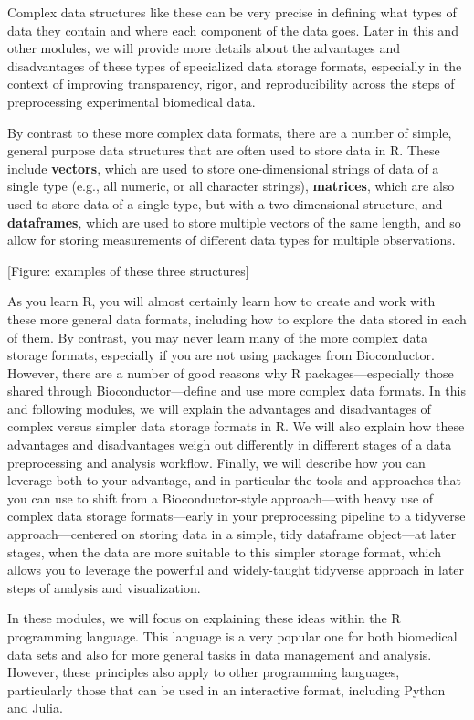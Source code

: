 \documentclass[]{tufte-book}
\begin{document}
Complex data structures like these can be very precise in defining what types of
data they contain and where each component of the data goes. Later in this and
other modules, we will provide more details about the advantages and
disadvantages of these types of specialized data storage formats, especially in
the context of improving transparency, rigor, and reproducibility across the
steps of preprocessing experimental biomedical data.

By contrast to these more complex data formats, there are a number of simple,
general purpose data structures that are often used to store data in R. These
include \textbf{vectors}, which are used to store one-dimensional strings of data of
a single type (e.g., all numeric, or all character strings), \textbf{matrices}, which
are also used to store data of a single type, but with a two-dimensional
structure, and \textbf{dataframes}, which are used to store multiple vectors of the
same length, and so allow for storing measurements of different data types for
multiple observations.

{[}Figure: examples of these three structures{]}

As you learn R, you will almost certainly learn how to create and work with
these more general data formats, including how to explore the data stored in
each of them. By contrast, you may never learn many of the more complex data
storage formats, especially if you are not using packages from Bioconductor.
However, there are a number of good reasons why R packages---especially those
shared through Bioconductor---define and use more complex data formats. In this
and following modules, we will explain the advantages and disadvantages of
complex versus simpler data storage formats in R. We will also explain how these
advantages and disadvantages weigh out differently in different stages of a data
preprocessing and analysis workflow. Finally, we will describe how you can
leverage both to your advantage, and in particular the tools and approaches that
you can use to shift from a Bioconductor-style approach---with heavy use of
complex data storage formats---early in your preprocessing pipeline to a
tidyverse approach---centered on storing data in a simple, tidy dataframe
object---at later stages, when the data are more suitable to this simpler
storage format, which allows you to leverage the powerful and widely-taught
tidyverse approach in later steps of analysis and visualization.

In these modules, we will focus on explaining these ideas within the R
programming language. This language is a very popular one for both biomedical
data sets and also for more general tasks in data management and analysis.
However, these principles also apply to other programming languages,
particularly those that can be used in an interactive format, including Python
and Julia.
\end{document}
